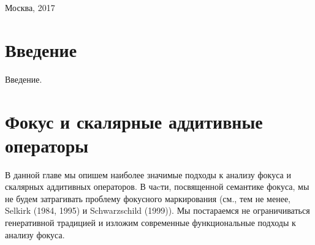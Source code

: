 \documentclass[a4paper, titlepage, 12pt]{article}
\begin{document}
\begin{titlepage}


{\large Москва, 2017} %


 


\end{titlepage}

\thispagestyle{empty} 
\tableofcontents
\thispagestyle{empty}

\clearpage


\section[Введение]{Введение}

Введение.

\setcounter{page}{1}

\section[Фокус и скалярные аддитивные операторы]{Фокус и скалярные аддитивные операторы}

В данной главе мы опишем наиболее значимые подходы к анализу фокуса и скалярных аддитивных операторов. В чаcти, посвященной семантике фокуса, мы не будем затрагивать проблему фокусного маркирования (см., тем не менее, Selkirk (1984, 1995) и  Schwarzschild (1999)). Мы постараемся не ограничиваться генеративной традицией и изложим современные функциональные подходы к анализу фокуса.
\end{document}
